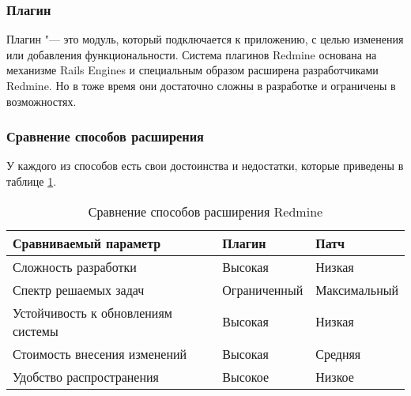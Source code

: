\subsubsection{Плагин}
Плагин "--- это модуль, который подключается к приложению, с целью изменения
или добавления  функциональности. Система плагинов Redmine основана на
механизме Rails Engines и специальным образом расширена разработчиками Redmine.
 Но в тоже время они
достаточно сложны в разработке и ограничены в возможностях. 

\subsubsection{Сравнение способов расширения}
У каждого из способов есть свои достоинства и недостатки, которые приведены в
таблице \ref{comparing_extensions}.
\begin{table}[hb!]
\small
\centering
\begin{tabular}{ 
|>{\centering\arraybackslash}m{}
|>{\centering\arraybackslash}m{}
|>{\centering\arraybackslash}m{}|}
\hline
\textbf{Сравниваемый параметр} & \textbf{Плагин} & \textbf{Патч}\\
\hline
Сложность разработки & Высокая & Низкая \\
\hline
Спектр решаемых задач & Ограниченный & Максимальный\\
\hline
Устойчивость к обновлениям системы & Высокая & Низкая \\
\hline
Стоимость внесения изменений & Высокая & Средняя \\
\hline
Удобство распространения & Высокое & Низкое \\
\hline
\end{tabular}
\caption{Сравнение способов расширения Redmine}
\label{comparing_extensions}
\end{table}


